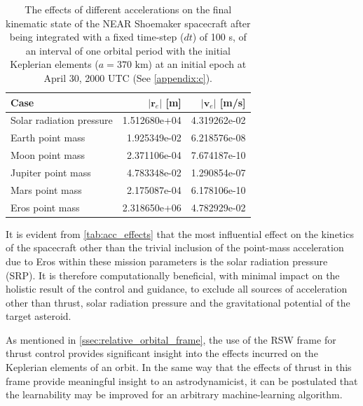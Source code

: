 \begin{table}
    \caption{
        The effects of different accelerations on the final kinematic state of
        the NEAR Shoemaker spacecraft \textmd{after being integrated with a
        fixed time-step ($dt$) of 100 s, of an interval of one orbital period
        with the initial Keplerian elements ($a=370\textrm{ km}$) at an initial
        epoch at April 30, 2000 UTC (See \autoref{appendix:c}).}
    }
    \centering
    \label{tab:acc_effects}
    \begin{tabular}{lrr}

        Case                     & $|\mathbf{r}_{e}|$ [m] & $|\mathbf{v}_{e}|$ [m/s] \\
        \hline\hline
        Solar radiation pressure & 1.512680e+04           & 4.319262e-02             \\
        Earth point mass         & 1.925349e-02           & 6.218576e-08             \\
        Moon point mass          & 2.371106e-04           & 7.674187e-10             \\
        Jupiter point mass       & 4.783348e-02           & 1.290854e-07             \\
        Mars point mass          & 2.175087e-04           & 6.178106e-10             \\
        Eros point mass          & 2.318650e+06           & 4.782929e-02             \\

    \end{tabular}
\end{table}

It is evident from \autoref{tab:acc_effects} that the most influential effect on the kinetics of the spacecraft other than the trivial inclusion of the point-mass acceleration due to Eros within these mission parameters is the solar radiation pressure (SRP). It is therefore computationally beneficial, with minimal impact on the holistic result of the control and guidance, to exclude all sources of acceleration other than thrust, solar radiation pressure and the gravitational potential of the target asteroid.

As mentioned in \autoref{ssec:relative_orbital_frame}, the use of the RSW frame for thrust control provides significant insight into the effects incurred on the Keplerian elements of an orbit. In the same way that the effects of thrust in this frame provide meaningful insight to an astrodynamicist, it can be postulated that the learnability may be improved for an arbitrary machine-learning algorithm.

